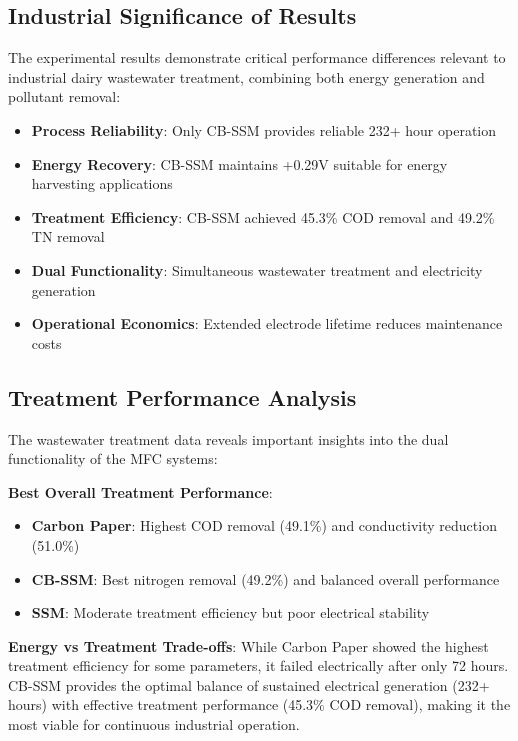 \documentclass[12pt,a4paper]{article}
\begin{document}
\subsection{Industrial Significance of Results}

The experimental results demonstrate critical performance differences relevant to industrial dairy wastewater treatment, combining both energy generation and pollutant removal:

\begin{itemize}
    \item \textbf{Process Reliability}: Only CB-SSM provides reliable 232+ hour operation
    \item \textbf{Energy Recovery}: CB-SSM maintains +0.29V suitable for energy harvesting applications
    \item \textbf{Treatment Efficiency}: CB-SSM achieved 45.3\% COD removal and 49.2\% TN removal
    \item \textbf{Dual Functionality}: Simultaneous wastewater treatment and electricity generation
    \item \textbf{Operational Economics}: Extended electrode lifetime reduces maintenance costs
\end{itemize}

\subsection{Treatment Performance Analysis}

The wastewater treatment data reveals important insights into the dual functionality of the MFC systems:

\textbf{Best Overall Treatment Performance}:
\begin{itemize}
    \item \textbf{Carbon Paper}: Highest COD removal (49.1\%) and conductivity reduction (51.0\%)
    \item \textbf{CB-SSM}: Best nitrogen removal (49.2\%) and balanced overall performance
    \item \textbf{SSM}: Moderate treatment efficiency but poor electrical stability
\end{itemize}

\textbf{Energy vs Treatment Trade-offs}:
While Carbon Paper showed the highest treatment efficiency for some parameters, it failed electrically after only 72 hours. CB-SSM provides the optimal balance of sustained electrical generation (232+ hours) with effective treatment performance (45.3\% COD removal), making it the most viable for continuous industrial operation.
\end{document}
